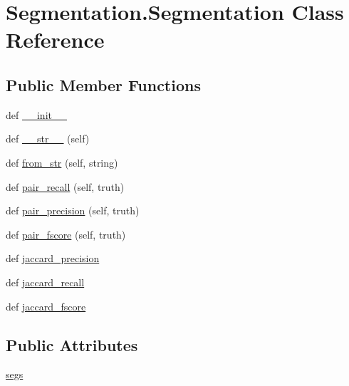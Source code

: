\hypertarget{class_segmentation_1_1_segmentation}{}\section{Segmentation.\+Segmentation Class Reference}
\label{class_segmentation_1_1_segmentation}
\subsection*{Public Member Functions}
\begin{DoxyCompactItemize}
\item 
def \hyperlink{class_segmentation_1_1_segmentation_ad751701c6617728b68b06e32962b6156}{\+\_\+\+\_\+init\+\_\+\+\_\+}
\item 
def \hyperlink{class_segmentation_1_1_segmentation_a07fb536f1e4109215a8cc61524353788}{\+\_\+\+\_\+str\+\_\+\+\_\+} (self)
\item 
def \hyperlink{class_segmentation_1_1_segmentation_a8b24c53ea92aa10f735b769094881b6e}{from\+\_\+str} (self, string)
\item 
def \hyperlink{class_segmentation_1_1_segmentation_a77218c60fc3fd240ad50caabb56b6d42}{pair\+\_\+recall} (self, truth)
\item 
def \hyperlink{class_segmentation_1_1_segmentation_a7233b24262403f2a760a13fb44f0471e}{pair\+\_\+precision} (self, truth)
\item 
def \hyperlink{class_segmentation_1_1_segmentation_abf3b4d99e64e90f7a0216afca4f1f7e1}{pair\+\_\+fscore} (self, truth)
\item 
def \hyperlink{class_segmentation_1_1_segmentation_ad0e4c4ed36785f67a6420179b3386608}{jaccard\+\_\+precision}
\item 
def \hyperlink{class_segmentation_1_1_segmentation_ab5197a59601c0819874bcb34cf063640}{jaccard\+\_\+recall}
\item 
def \hyperlink{class_segmentation_1_1_segmentation_a750bcfb53d797bd75c24c2ef7179fdf2}{jaccard\+\_\+fscore}
\end{DoxyCompactItemize}
\subsection*{Public Attributes}
\begin{DoxyCompactItemize}
\item 
\hyperlink{class_segmentation_1_1_segmentation_a7b8d2af30553466c5b027f50618e2ba2}{segs}
\end{DoxyCompactItemize}


